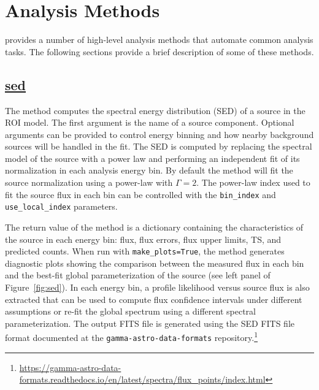 \documentclass{PoS}
\newcommand{\url}[1]{\href{#1}{#1}}
\begin{document}
\section{Analysis Methods}

{\fermipy} provides a number of high-level analysis methods that
automate common analysis tasks.  The following sections provide a
brief description of some of these methods.

\subsection{\href{http://fermipy.readthedocs.org/en/latest/advanced/sed.html}{sed}}

The {\sed} method computes the spectral energy distribution (SED) of a
source in the ROI model.  The first argument is the name of a source
component.  Optional arguments can be provided to control energy
binning and how nearby background sources will be handled in the fit.
The SED is computed by replacing the spectral model of the source with
a power law and performing an independent fit of its normalization in
each analysis energy bin.  By default the method will fit the source
normalization using a power-law with $\Gamma=2$.  The power-law index
used to fit the source flux in each bin can be controlled with the
\lstinline$bin_index$ and \lstinline$use_local_index$ parameters.

The return value of the method is a dictionary containing the
characteristics of the source in each energy bin: flux, flux errors,
flux upper limits, TS, and predicted counts.  When run with
\lstinline$make_plots=True$, the method generates diagnostic plots
showing the comparison between the measured flux in each bin and the
best-fit global parameterization of the source (see left panel of
Figure~\ref{fig:sed}).  In each energy bin, a profile likelihood
versus source flux is also extracted that can be used to compute flux
confidence intervals under different assumptions or re-fit the global
spectrum using a different spectral parameterization.  The output FITS
file is generated using the SED FITS file format documented at the
\texttt{gamma-astro-data-formats}
repository.\footnote{\url{https://gamma-astro-data-formats.readthedocs.io/en/latest/spectra/flux\_points/index.html}}
\end{document}
